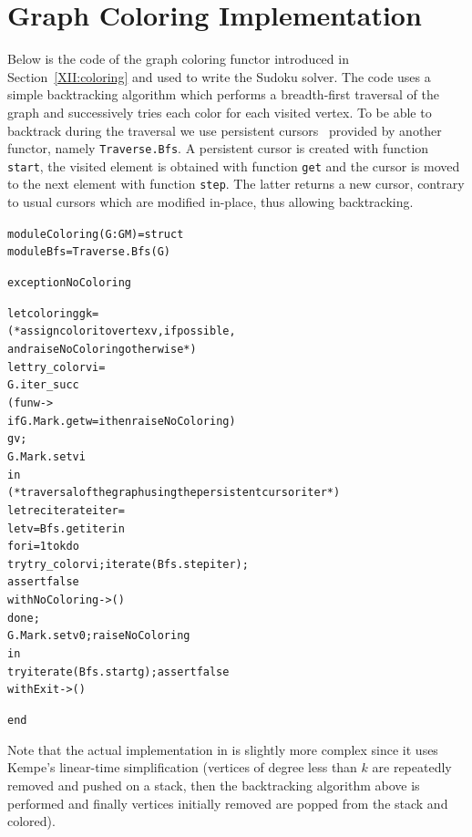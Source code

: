 \section{Graph Coloring Implementation}\label{XII:appendix:coloring}

Below is the code of the graph coloring functor introduced in
Section~\ref{XII:coloring} and used to write the Sudoku solver.
The code uses a simple backtracking algorithm which
performs a breadth-first traversal of the graph and successively tries
each color for each visited vertex. To be able to backtrack during the
traversal we use persistent cursors~\cite{XII:filliatre06} provided by
another \ocamlgraph functor, namely \texttt{Traverse.Bfs}. A
persistent cursor is created with function \texttt{start}, the
visited element is obtained with function \texttt{get} and the cursor
is moved to the next element with function \texttt{step}. The latter
returns a new cursor, contrary to usual cursors which are modified
in-place, thus allowing backtracking.
\begin{alltt}
module Coloring(G : GM) = struct
  module Bfs = Traverse.Bfs(G)

  exception NoColoring

  let coloring g k =
    (* assign color i to vertex v, if possible, 
       and raise NoColoring otherwise *)
    let try_color v i =
      G.iter_succ 
        (fun w -> 
          if G.Mark.get w = i then raise NoColoring) 
        g v;
      G.Mark.set v i
    in
    (* traversal of the graph using the persistent cursor iter *)
    let rec iterate iter =
      let v = Bfs.get iter in
      for i = 1 to k do
        try try_color v i; iterate (Bfs.step iter); 
            assert false
        with NoColoring -> ()
      done;
      G.Mark.set v 0; raise NoColoring
    in
    try iterate (Bfs.start g); assert false 
    with Exit -> ()

end
\end{alltt}
Note that the actual implementation in \ocamlgraph is slightly more complex
since it uses Kempe's linear-time simplification (vertices of degree
less than $k$ are repeatedly removed and pushed on a stack, then the
backtracking algorithm above is performed and finally vertices
initially removed are popped from the stack and colored).

